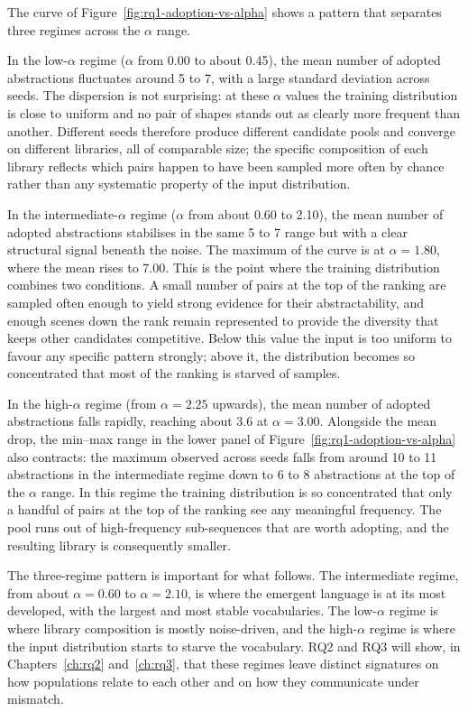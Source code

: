 The curve of Figure~\ref{fig:rq1-adoption-vs-alpha} shows a pattern that separates three regimes across the $\alpha$ range.

In the low-$\alpha$ regime ($\alpha$ from 0.00 to about 0.45), the mean number of adopted abstractions fluctuates around 5 to 7, with a large standard deviation across seeds. The dispersion is not surprising: at these $\alpha$ values the training distribution is close to uniform and no pair of shapes stands out as clearly more frequent than another. Different seeds therefore produce different candidate pools and converge on different libraries, all of comparable size; the specific composition of each library reflects which pairs happen to have been sampled more often by chance rather than any systematic property of the input distribution.

In the intermediate-$\alpha$ regime ($\alpha$ from about 0.60 to 2.10), the mean number of adopted abstractions stabilises in the same 5 to 7 range but with a clear structural signal beneath the noise. The maximum of the curve is at $\alpha = 1.80$, where the mean rises to 7.00. This is the point where the training distribution combines two conditions. A small number of pairs at the top of the ranking are sampled often enough to yield strong evidence for their abstractability, and enough scenes down the rank remain represented to provide the diversity that keeps other candidates competitive. Below this value the input is too uniform to favour any specific pattern strongly; above it, the distribution becomes so concentrated that most of the ranking is starved of samples.

In the high-$\alpha$ regime (from $\alpha = 2.25$ upwards), the mean number of adopted abstractions falls rapidly, reaching about 3.6 at $\alpha = 3.00$. Alongside the mean drop, the min--max range in the lower panel of Figure~\ref{fig:rq1-adoption-vs-alpha} also contracts: the maximum observed across seeds falls from around 10 to 11 abstractions in the intermediate regime down to 6 to 8 abstractions at the top of the $\alpha$ range. In this regime the training distribution is so concentrated that only a handful of pairs at the top of the ranking see any meaningful frequency. The pool runs out of high-frequency sub-sequences that are worth adopting, and the resulting library is consequently smaller.

The three-regime pattern is important for what follows. The intermediate regime, from about $\alpha = 0.60$ to $\alpha = 2.10$, is where the emergent language is at its most developed, with the largest and most stable vocabularies. The low-$\alpha$ regime is where library composition is mostly noise-driven, and the high-$\alpha$ regime is where the input distribution starts to starve the vocabulary. RQ2 and RQ3 will show, in Chapters~\ref{ch:rq2} and~\ref{ch:rq3}, that these regimes leave distinct signatures on how populations relate to each other and on how they communicate under mismatch.

